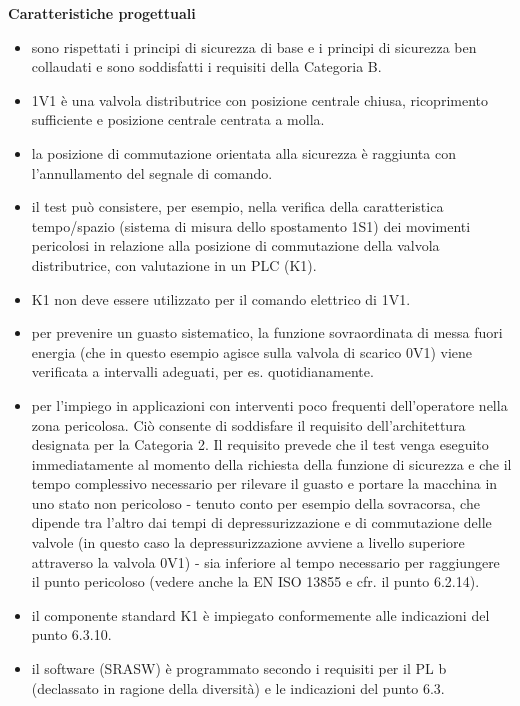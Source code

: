 \textbf{Caratteristiche progettuali}
\begin{itemize}
    \item sono rispettati i principi di sicurezza di base e i principi di sicurezza ben collaudati e sono soddisfatti i requisiti della Categoria B.
    \item 1V1 è una valvola distributrice con posizione centrale chiusa, ricoprimento sufficiente e posizione centrale centrata a molla.
    \item la posizione di commutazione orientata alla sicurezza è raggiunta con l'annullamento del segnale di comando.
    \item il test può consistere, per esempio, nella verifica della caratteristica tempo/spazio (sistema di misura dello spostamento 1S1) dei movimenti pericolosi in relazione alla posizione di commutazione della valvola distributrice, con valutazione in un PLC (K1).
    \item K1 non deve essere utilizzato per il comando elettrico di 1V1.
    \item per prevenire un guasto sistematico, la funzione sovraordinata di messa fuori energia (che in questo esempio agisce sulla valvola di scarico 0V1) viene verificata a intervalli adeguati, per es. quotidianamente.
    \item per l'impiego in applicazioni con interventi poco frequenti dell'operatore nella zona pericolosa. Ciò consente di soddisfare il requisito dell'architettura designata per la Categoria 2. Il requisito prevede che il test venga eseguito immediatamente al momento della richiesta della funzione di sicurezza e che il tempo complessivo necessario per rilevare il guasto e portare la macchina in uno stato non pericoloso - tenuto conto per esempio della sovracorsa, che dipende tra l'altro dai tempi di depressurizzazione e di commutazione delle valvole (in questo caso la depressurizzazione avviene a livello superiore attraverso la valvola 0V1) - sia inferiore al tempo necessario per raggiungere il punto pericoloso (vedere anche la EN ISO 13855 e cfr. il punto 6.2.14).
    \item il componente standard K1 è impiegato conformemente alle indicazioni del punto 6.3.10.
    \item il software (SRASW) è programmato secondo i requisiti per il PL b (declassato in ragione della diversità) e le indicazioni del punto 6.3.
\end{itemize}

